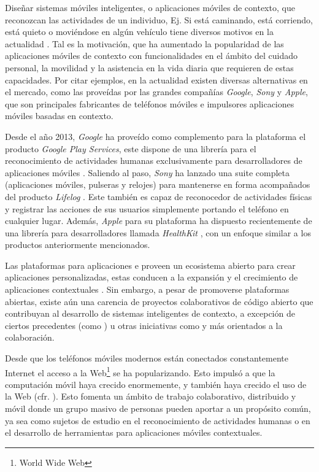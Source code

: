 Diseñar sistemas móviles inteligentes, o aplicaciones móviles de contexto,
que reconozcan las actividades de un individuo, Ej. Si está caminando,
está corriendo, está quieto o moviéndose en algún vehículo tiene diversos
motivos en la actualidad \cite{CampuzanoLopez2015,Google2013l}. Tal
es la motivación, que ha aumentado la popularidad de las aplicaciones
móviles de contexto con funcionalidades en el ámbito del cuidado personal,
la movilidad y la asistencia en la vida diaria que requieren de estas
capacidades. Por citar ejemplos, en la actualidad existen diversas
alternativas en el mercado, como las proveídas por las grandes compañías
\emph{Google}, \emph{Sony} y \emph{Apple}, que son principales fabricantes
de teléfonos móviles e impulsores aplicaciones móviles basadas en
contexto.

Desde el año 2013, \emph{Google} ha proveído como complemento para
la plataforma \emph{ }\cite{Google2005a} el producto
\emph{Google Play Services}, este dispone de una librería para el
reconocimiento de actividades humanas exclusivamente para desarrolladores
de aplicaciones móviles \cite{Google2013l}. Saliendo al paso, \emph{Sony}
ha lanzado una suite completa (aplicaciones móviles, pulseras y relojes)
para mantenerse en forma acompañados del producto \emph{Lifelog} \cite{Sony2016l}.
Este también es capaz de reconocedor de actividades físicas y registrar
las acciones de sus usuarios simplemente portando el teléfono en cualquier
lugar. Además, \emph{Apple} para su plataforma\emph{ }
\cite{Apple2007i} ha dispuesto recientemente de una librería para
desarrolladores llamada \emph{HealthKit} \cite{Apple2016h}, con un
enfoque similar a los productos anteriormente mencionados. 

Las plataformas para aplicaciones \emph{} e \emph{}
proveen un ecosistema abierto para crear aplicaciones personalizadas,
estas conducen a la expansión y el crecimiento de aplicaciones contextuales
\cite{Tanenbaum2010}. Sin embargo, a pesar de promoverse plataformas
abiertas, existe aún una carencia de proyectos colaborativos de código
abierto que contribuyan al desarrollo de sistemas inteligentes de
contexto, a excepción de ciertos precedentes (como \cite{Kwapisz2011,LaraLabrador2013})
u otras iniciativas como \cite{FUNF2016} y \cite{SensingKit2016}
más orientados a la colaboración.

Desde que los teléfonos móviles modernos están conectados constantemente
Internet el acceso a la Web\footnote{World Wide Web} se ha popularizando.
Esto impulsó a que la computación móvil haya crecido enormemente,
y también haya crecido el uso de la Web (cfr. \cite{NYTimes2008iph}).
Esto fomenta un ámbito de trabajo colaborativo, distribuido y móvil
donde un grupo masivo de personas pueden aportar a un propósito común,
ya sea como sujetos de estudio en el reconocimiento de actividades
humanas o en el desarrollo de herramientas para aplicaciones móviles
contextuales.

